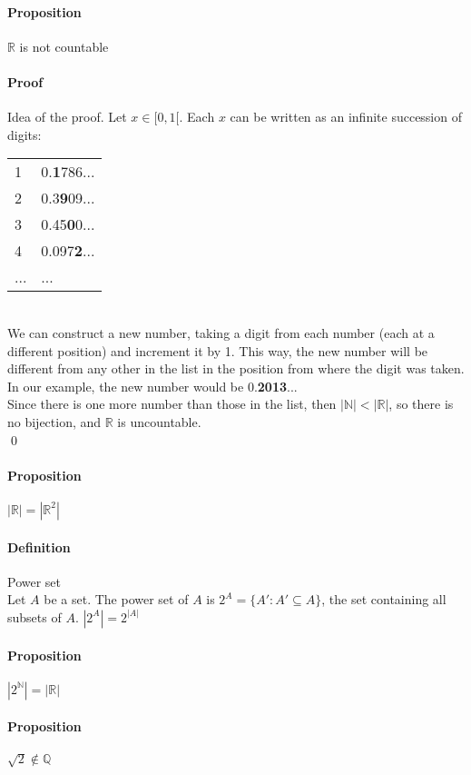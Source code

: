 \documentclass{article}
\newcommand{\N}{\mathbb{N}}
\newcommand{\Q}{\mathbb{Q}}
\newcommand{\R}{\mathbb{R}}
\newcommand{\Def}{\paragraph{Definition}}
\newcommand{\Proposition}{\paragraph{Proposition}}
\newcommand{\Proof}{\paragraph{Proof}}
\begin{document}
	\Proposition $\R$ is not countable

	\Proof Idea of the proof. Let $x \in {[}0,1{[}$. Each $x$ can be written as an
	infinite succession of digits:
\\\begin{tabular}{l|l}
		1 & 0.\textbf{1}786... \\
		2 & 0.3\textbf{9}09... \\
		3 & 0.45\textbf{0}0... \\
		4 & 0.097\textbf{2}... \\
		... & ...
	\end{tabular}
\\We can construct a new number, taking a digit from each number (each at a
	different position) and increment it by 1. This way, the new number will be
	different from any other in the list in the position from where the digit was
	taken. In our example, the new number would be 0.\textbf{2013}...
\\Since there is one more number than those in the list, then $|\N| < |\R|$, so
	there is no bijection, and $\R$ is uncountable.
\\\qed

	\Proposition $|\R| = |\R^2|$

	\Def Power set
\\Let $A$ be a set. The power set of $A$ is $2^A = \{ A' : A' \subseteq A \}$,
	the set containing all subsets of $A$. $|2^A| = 2^{|A|}$

	\Proposition $|2^{\N}| = |\R|$

	\Proposition $\sqrt{2} \notin \Q$
\end{document}
